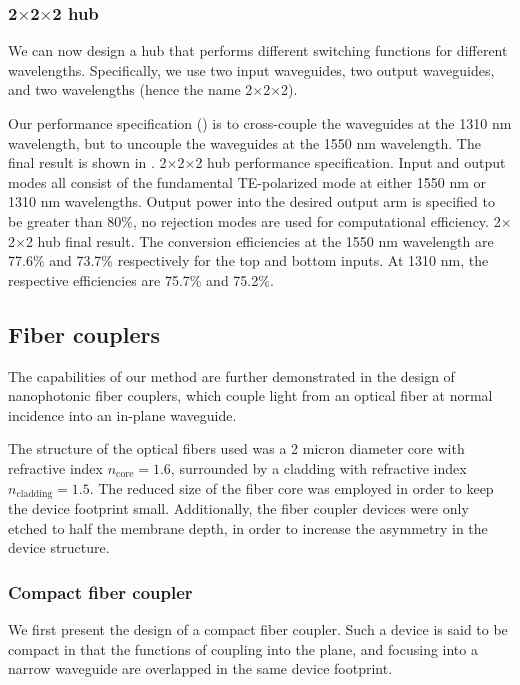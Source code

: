 \documentclass[letterpaper,10pt]{article}
\begin{document}
\subsubsection{2$\times$2$\times$2 hub}
We can now design a hub that performs 
    different switching functions for different wavelengths.
Specifically, we use two input waveguides, two output waveguides,
    and two wavelengths (hence the name 2$\times$2$\times$2).

Our performance specification () is
    to cross-couple the waveguides at the 1310 nm wavelength,
    but to uncouple the waveguides at the 1550 nm wavelength.
The final result is shown in .
    {2$\times$2$\times$2 hub performance specification.
    Input and output modes all consist of the fundamental TE-polarized mode
        at either 1550 nm or 1310 nm wavelengths.
    Output power into the desired output arm is specified to be greater than 80\%,
        no rejection modes are used for computational efficiency.}
    {2$\times$2$\times$2 hub final result.
    The conversion efficiencies at the 1550 nm wavelength 
        are 77.6\% and 73.7\% respectively for the top and bottom inputs.
    At 1310 nm, the respective efficiencies are 75.7\% and 75.2\%.}

\subsection{Fiber couplers}
The capabilities of our method are further demonstrated
    in the design of nanophotonic fiber couplers,
    which couple light from an optical fiber at normal incidence
    into an in-plane waveguide.

The structure of the optical fibers used was a 2 micron diameter core with 
    refractive index $n_\text{core} = 1.6$,
    surrounded by a cladding with refractive index $n_\text{cladding}=1.5$.
The reduced size of the fiber core was employed in order
    to keep the device footprint small.
Additionally, the fiber coupler devices were only etched to half the membrane depth,
    in order to increase the asymmetry in the device structure.

\subsubsection{Compact fiber coupler}
We first present the design of a compact fiber coupler.
Such a device is said to be compact in that the functions
    of coupling into the plane, and focusing into a narrow waveguide
    are overlapped in the same device footprint.
\end{document}
